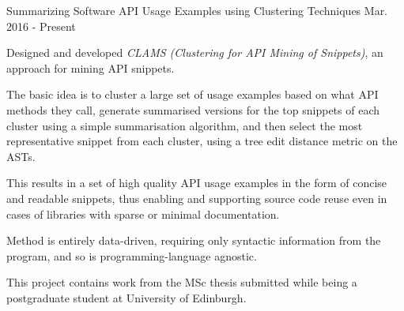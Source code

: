 

\begin{cventries}

  \cventry
    {Summarizing Software API Usage Examples using
Clustering Techniques} %
	{}
	{}
    {Mar. 2016 - Present} %
    {
      \begin{cvitems} %
        \item {Designed and developed \textit{CLAMS (Clustering for API Mining of Snippets)}, an approach for mining API snippets.}
		\item {The basic idea is to cluster a large set of usage examples based on what API methods they call, generate summarised versions for the top snippets of each cluster using a simple summarisation algorithm, and then select the most representative snippet from each cluster, using a tree edit distance metric on the ASTs.}
		\item {This results in a set of high quality API usage examples in the form of concise and readable snippets, thus enabling and supporting source code reuse even in cases of libraries with sparse or minimal documentation.}
		\item {Method is entirely data-driven, requiring only syntactic information from the program, and so is programming-language agnostic.}
		\item {This project contains work from the MSc thesis submitted while being a postgraduate student at University of Edinburgh.}
      \end{cvitems}
    }
    

\end{cventries}
